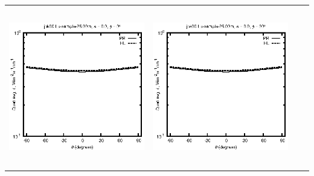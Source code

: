 \documentclass[10pt,a4paper]{article}
\begin{document}
\begin{adjustwidth}{-1.2in}{-1.2in}
\begin{tabular}{c c c c}
\includegraphics[height=7cm]{../eps/jok00_Lu_sample_25.00m_fwd.eps} &
\includegraphics[height=7cm]{../eps/jok00_Lu_sample_25.00m_cross.eps} \\
\end{tabular}

\pagebreak


\end{adjustwidth}
\end{document}
